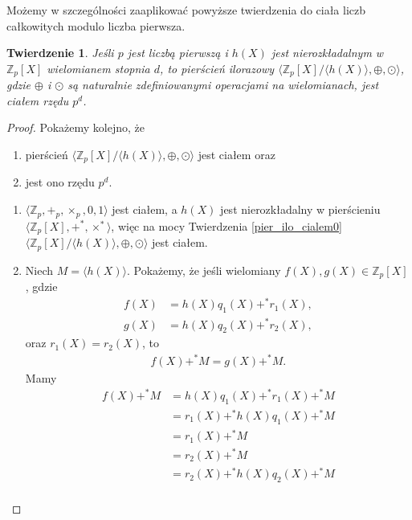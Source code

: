 \documentclass[declaration,shortabstract]{iithesis}
\theoremstyle{definition}
\theoremstyle{remark} \newtheorem{observation}{Obserwacja}
\theoremstyle{plain} \newtheorem{theorem}{Twierdzenie}
\theoremstyle{plain} \newtheorem{lemma}{Lemat}
\theoremstyle{remark} \newtheorem*{remark*}{Uwaga}
\theoremstyle{reminder} \newtheorem*{reminder*}{Przypomnienie}
\begin{document}
Możemy w szczególności zaaplikować powyższe twierdzenia do ciała liczb całkowitych modulo liczba pierwsza.

\begin{theorem} \label{pier_ilo_cialem}
	Jeśli $p$ jest liczbą pierwszą i $h(X)$ jest nierozkładalnym w $\mathbb{Z}_p[X]$ wielomianem stopnia $d$, to pierścień ilorazowy $\langle \mathbb{Z}_p[X]/\langle h(X) \rangle, \oplus, \odot \rangle$, gdzie $\oplus$ i $\odot$ są naturalnie zdefiniowanymi operacjami na wielomianach, jest ciałem rzędu $p^d$.
\end{theorem}

\begin{proof}
	Pokażemy kolejno, że 
	\begin{enumerate}[label=\arabic*.,leftmargin=.4in]
		\item pierścień $\langle \mathbb{Z}_p[X]/\langle h(X) \rangle, \oplus, \odot \rangle$ jest ciałem oraz
		\item jest ono rzędu $p^d$.
	\end{enumerate}
	\begin{enumerate}[label=Ad.\arabic*.,leftmargin=.4in]
		\item $\langle \mathbb{Z}_p, +_p, \times_p, 0, 1 \rangle$ jest ciałem, a $h(X)$ jest nierozkładalny w pierścieniu $\langle \mathbb{Z}_p[X], +^*, \times^* \rangle$, więc na mocy Twierdzenia \ref{pier_ilo_cialem0}$\langle \mathbb{Z}_p[X]/\langle h(X) \rangle, \oplus, \odot \rangle$ jest ciałem.
		\item Niech $M = \langle h(X) \rangle$. Pokażemy, że jeśli wielomiany $f(X), g(X) \in \mathbb{Z}_p[X]$, gdzie 
		      \begin{align*}
		      	f(X) & = h(X)q_1(X) +^* r_1(X), \\
		      	g(X) & = h(X)q_2(X) +^* r_2(X), 
		      \end{align*}
		      oraz $r_1(X) = r_2(X)$, to 
		      \begin{align*}
		      	f(X) +^* M = g(X) +^* M. 
		      \end{align*}
		      Mamy 
		      \begin{align*}
		      	f(X) +^* M & = h(X)q_1(X) +^* r_1(X) +^* M  \\
		      	           & = r_1(X) +^* h (X)q_1(X) +^* M \\
		      	           & = r_1(X) +^* M                 \\
		      	           & = r_2(X) +^* M                 \\
		      	           & = r_2(X) +^* h(X)q_2(X) +^* M  \\

\end{align*}
\end{enumerate}
\end{proof}
\end{document}
